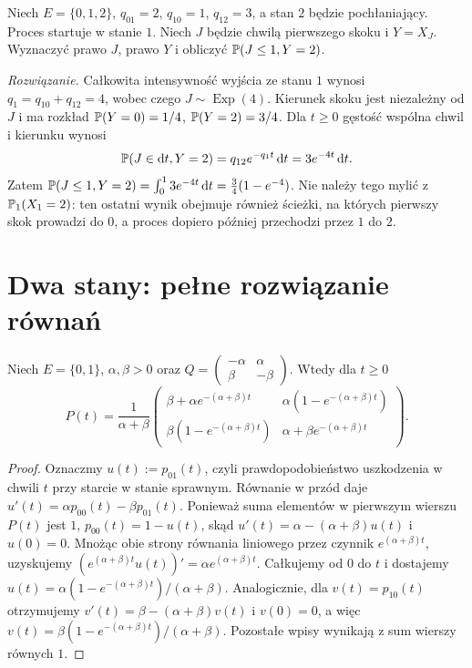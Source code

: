 \begin{zadanie}
Niech $E=\{0,1,2\}$, $q_{01}=2$, $q_{10}=1$,
$q_{12}=3$, a stan $2$ będzie pochłaniający.
Proces startuje w stanie $1$. Niech $J$ będzie chwilą
pierwszego skoku i $Y=X_J$. Wyznaczyć prawo $J$, prawo
$Y$ i obliczyć $\mathbb{P}(J\le1,Y=2)$.

\emph{Rozwiązanie.} Całkowita intensywność wyjścia ze
stanu $1$ wynosi $q_1=q_{10}+q_{12}=4$, wobec czego
$J\sim\operatorname{Exp}(4)$. Kierunek skoku jest
niezależny od $J$ i ma rozkład
$\mathbb{P}(Y=0)=1/4$, $\mathbb{P}(Y=2)=3/4$.
Dla $t\ge0$ gęstość wspólna chwil i kierunku wynosi
\[
\mathbb{P}(J\in\mathrm{d} t,Y=2)=q_{12}e^{-q_1t}\,\mathrm{d} t
=3e^{-4t}\,\mathrm{d} t.
\]
Zatem
$\mathbb{P}(J\le1,Y=2)=\int_0^1 3e^{-4t}\,\mathrm{d} t
=\tfrac34(1-e^{-4})$.
Nie należy tego mylić z $\mathbb{P}_1(X_1=2)$:
ten ostatni wynik obejmuje również ścieżki, na których
pierwszy skok prowadzi do $0$, a proces dopiero później
przechodzi przez $1$ do $2$.
\end{zadanie}

\section{Dwa stany: pełne rozwiązanie równań}
\begin{twierdzenie}
Niech $E=\{0,1\}$, $\alpha,\beta>0$ oraz
$Q=\left(\begin{smallmatrix}-\alpha&\alpha\\
\beta&-\beta\end{smallmatrix}\right)$.
Wtedy dla $t\ge0$
\[
P(t)=\frac1{\alpha+\beta}
\begin{pmatrix}
\beta+\alpha e^{-(\alpha+\beta)t} &
\alpha(1-e^{-(\alpha+\beta)t})\\
\beta(1-e^{-(\alpha+\beta)t})&
\alpha+\beta e^{-(\alpha+\beta)t}
\end{pmatrix}.
\]
\end{twierdzenie}
\begin{proof}
Oznaczmy $u(t):=p_{01}(t)$, czyli prawdopodobieństwo
uszkodzenia w chwili $t$ przy starcie w stanie sprawnym.
Równanie w przód daje
$u'(t)=\alpha p_{00}(t)-\beta p_{01}(t)$.
Ponieważ suma elementów w pierwszym wierszu $P(t)$ jest $1$,
$p_{00}(t)=1-u(t)$, skąd
$u'(t)=\alpha-(\alpha+\beta)u(t)$ i $u(0)=0$.
Mnożąc obie strony równania liniowego przez czynnik
$e^{(\alpha+\beta)t}$, uzyskujemy
$(e^{(\alpha+\beta)t}u(t))'=\alpha e^{(\alpha+\beta)t}$.
Całkujemy od $0$ do $t$ i dostajemy
$u(t)=\alpha(1-e^{-(\alpha+\beta)t})/(\alpha+\beta)$.
Analogicznie, dla $v(t)=p_{10}(t)$ otrzymujemy
$v'(t)=\beta-(\alpha+\beta)v(t)$ i $v(0)=0$,
a więc $v(t)=\beta(1-e^{-(\alpha+\beta)t})/(\alpha+\beta)$.
Pozostałe wpisy wynikają z sum wierszy równych $1$.
\end{proof}

